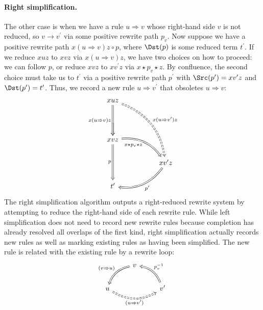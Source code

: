 \documentclass[../generics]{subfiles}
\begin{document}
\paragraph{Right simplification.} The other case is when we have a rule $u\Rightarrow v$ whose right-hand side $v$ is not reduced, so $v\rightarrow v^\prime$ via some positive rewrite path $p_v$. Now suppose we have a positive rewrite path $x(u\Rightarrow v)z\circ p$, where $\Dst(p)$ is some reduced term $t^\prime$. If we reduce $xuz$ to $xvz$ via $x(u\Rightarrow v)z$, we have two choices on how to proceed: we can follow $p$, or reduce $xvz$ to $xv^\prime z$ via $x\star p_v \star z$. By confluence, the second choice must take us to $t^\prime$ via a positive rewrite path $p^\prime$ with $\Src(p^\prime)=xv^\prime z$ and $\Dst(p^\prime)=t^\prime$. Thus, we record a new rule $u\Rightarrow v^\prime$ that obsoletes $u\Rightarrow v$:
\[
\begin{tikzcd}
&xuz\arrow[dd, Rightarrow, "x(u\Rightarrow v)z"']\arrow[rrddd, Rightarrow, bend left, "x(u\Rightarrow v^\prime)z", dashed]&\\
&\arrow[d, Rightarrow]&\\
&xvz\arrow[dd, Rightarrow, "p"']\arrow[rrd, Rightarrow, "x\star p_v\star z"', bend left]\\
&&&xv^\prime z\arrow[lld, "p^\prime", Rightarrow, bend left]\\
&t^\prime&
\end{tikzcd}
\]
The right simplification algorithm outputs a right-reduced rewrite system by attempting to reduce the right-hand side of each rewrite rule. While left simplification does not need to record new rewrite rules because completion has already resolved all overlaps of the first kind, right simplification actually records new rules as well as marking existing rules as having been simplified. The new rule is related with the existing rule by a rewrite loop:
\[
\begin{tikzcd}
&v\arrow[ld, Rightarrow, "(v\Rightarrow u)"', bend right]&\\
u\arrow[rr, Rightarrow, "(u\Rightarrow v^\prime)"', dashed, bend right]&&v^\prime\arrow[lu, Rightarrow, "p_v^{-1}"', bend right]
\end{tikzcd}
\]
\end{document}

